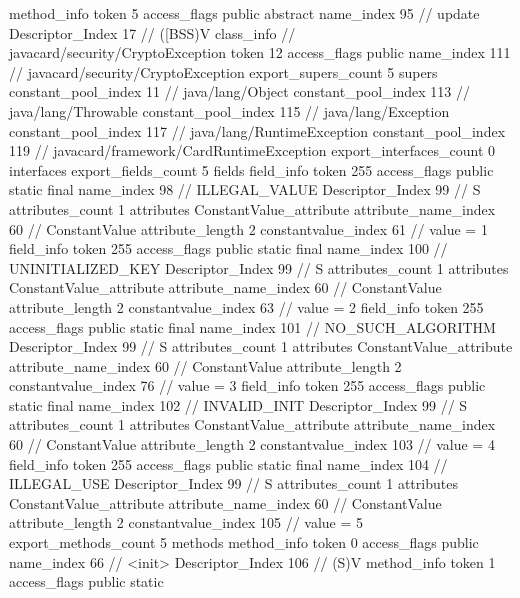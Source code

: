 {{{{{				}
				method_info {
					token	5
					access_flags	public abstract
					name_index	95		// update
					Descriptor_Index	17		// ([BSS)V
				}
			}
		}
		class_info {		// javacard/security/CryptoException
			token	12
			access_flags	public
			name_index	111		// javacard/security/CryptoException
			export_supers_count	5
			supers {
				constant_pool_index	11		// java/lang/Object
				constant_pool_index	113		// java/lang/Throwable
				constant_pool_index	115		// java/lang/Exception
				constant_pool_index	117		// java/lang/RuntimeException
				constant_pool_index	119		// javacard/framework/CardRuntimeException
			}
			export_interfaces_count	0
			interfaces {
			}
			export_fields_count	5
			fields {
			field_info {
				token	255
				access_flags	public static final
				name_index	98		// ILLEGAL_VALUE
				Descriptor_Index	99		// S
				attributes_count	1
				attributes {
				ConstantValue_attribute {
					attribute_name_index	60		// ConstantValue
					attribute_length	2
					constantvalue_index	61		// value = 1
				}
				}
			}
			field_info {
				token	255
				access_flags	public static final
				name_index	100		// UNINITIALIZED_KEY
				Descriptor_Index	99		// S
				attributes_count	1
				attributes {
				ConstantValue_attribute {
					attribute_name_index	60		// ConstantValue
					attribute_length	2
					constantvalue_index	63		// value = 2
				}
				}
			}
			field_info {
				token	255
				access_flags	public static final
				name_index	101		// NO_SUCH_ALGORITHM
				Descriptor_Index	99		// S
				attributes_count	1
				attributes {
				ConstantValue_attribute {
					attribute_name_index	60		// ConstantValue
					attribute_length	2
					constantvalue_index	76		// value = 3
				}
				}
			}
			field_info {
				token	255
				access_flags	public static final
				name_index	102		// INVALID_INIT
				Descriptor_Index	99		// S
				attributes_count	1
				attributes {
				ConstantValue_attribute {
					attribute_name_index	60		// ConstantValue
					attribute_length	2
					constantvalue_index	103		// value = 4
				}
				}
			}
			field_info {
				token	255
				access_flags	public static final
				name_index	104		// ILLEGAL_USE
				Descriptor_Index	99		// S
				attributes_count	1
				attributes {
				ConstantValue_attribute {
					attribute_name_index	60		// ConstantValue
					attribute_length	2
					constantvalue_index	105		// value = 5
				}
				}
			}
			}
			export_methods_count	5
			methods {
				method_info {
					token	0
					access_flags	public
					name_index	66		// <init>
					Descriptor_Index	106		// (S)V
				}
				method_info {
					token	1
					access_flags	public static
}}}}}
